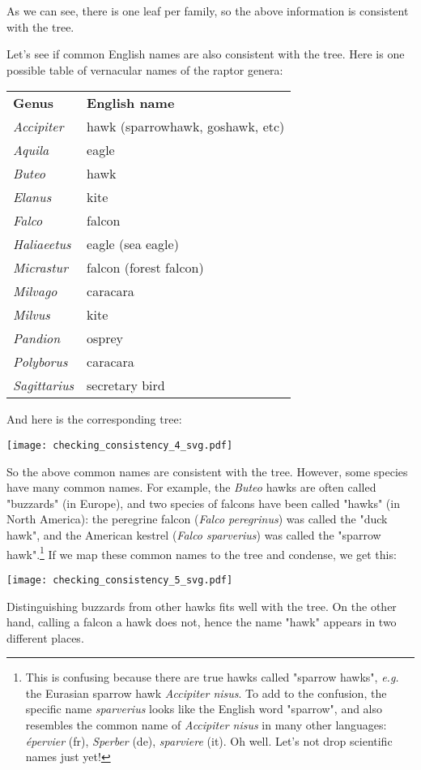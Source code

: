 \bigskip{}
\noindent{}As we can see, there is one leaf per family, so the above
information is consistent with the tree.

Let's see if common English names are also consistent with the tree. Here is
one possible table of vernacular names of the raptor genera: 

\bigskip{}
\begin{tabular}{ll}
\textbf{Genus} & \textbf{English name} \\
\textit{Accipiter} & hawk (sparrowhawk, goshawk, etc)\\
\textit{Aquila} & eagle  \\
\textit{Buteo} & hawk \\
\textit{Elanus} & kite \\
\textit{Falco} & falcon \\
\textit{Haliaeetus} & eagle (sea eagle) \\
\textit{Micrastur} & falcon (forest falcon)\\
\textit{Milvago} & caracara \\
\textit{Milvus} & kite \\
\textit{Pandion} & osprey \\
\textit{Polyborus} & caracara \\
\textit{Sagittarius} & secretary bird
\end{tabular}
\bigskip{}

And here is the corresponding tree:


\texttt{[image: checking\_consistency\_4\_svg.pdf]}
\bigskip{}

So the above common names are consistent with the tree. However, some species
have many common names. For example, the \textit{Buteo} hawks are often called
"buzzards" (in Europe), and two species of falcons have been called "hawks" (in
North America): the peregrine falcon (\textit{Falco peregrinus}) was called the
"duck hawk", and the American kestrel (\textit{Falco sparverius}) was called
the "sparrow hawk".\footnote{This is confusing because there are true hawks
called "sparrow hawks", \emph{e.g.} the Eurasian sparrow hawk \textit{Accipiter
nisus}. To add to the confusion, the specific name \textit{sparverius} looks
like the English word "sparrow", and also resembles the common name of
\textit{Accipiter nisus} in many other languages: \textit{\'{e}pervier} (fr), \textit{Sperber} (de), \textit{sparviere} (it). Oh well. Let's not drop scientific names just yet!} If we
map these common names to the tree and condense, we get this:


\texttt{[image: checking\_consistency\_5\_svg.pdf]}
\bigskip{}

\noindent{}Distinguishing buzzards from other hawks fits well with the tree. On
the other hand, calling a falcon a hawk does not, hence the name "hawk" appears
in two different places.
